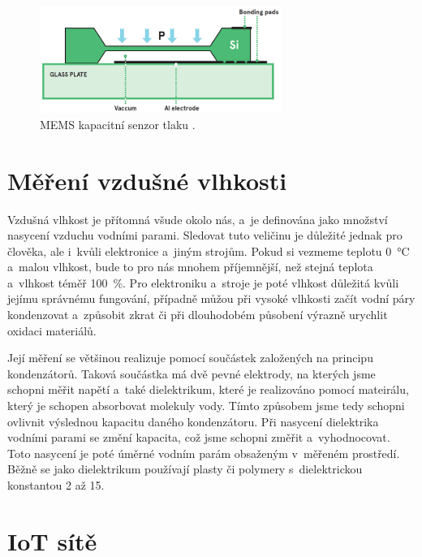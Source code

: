 \begin{figure}
    \centering
    \includegraphics[width=0.7\textwidth]{obrazky/MEMS_capacitive_sensor.jpg}
    \caption[MEMS kapacitní senzor tlaku.]{MEMS kapacitní senzor tlaku \cite{AvnetMEMS}.}
    \label{fig_memsCapacitiveSensor}
\end{figure}

\section{Měření vzdušné vlhkosti}

Vzdušná vlhkost je přítomná všude okolo nás, a~je definována jako množství nasycení vzduchu vodními parami. Sledovat tuto veličinu je důležité jednak pro člověka, ale i~kvůli elektronice a~jiným strojům. Pokud si vezmeme teplotu \SI{0}{\celsius} a~malou vlhkost, bude to pro nás mnohem příjemnější, než stejná teplota a~vlhkost téměř \SI{100}{\percent}. Pro elektroniku a~stroje je poté vlhkost důležitá kvůli jejímu správnému fungování, případně můžou při vysoké vlhkosti začít vodní páry kondenzovat a~způsobit zkrat či při dlouhodobém působení výrazně urychlit oxidaci materiálů.

Její měření se většinou realizuje pomocí součástek založených na principu kondenzátorů. Taková součástka má dvě pevné elektrody, na kterých jsme schopni měřit napětí a~také dielektrikum, které je realizováno pomocí mateirálu, který je schopen absorbovat molekuly vody. Tímto způsobem jsme tedy schopni ovlivnit výslednou kapacitu daného kondenzátoru. Při nasycení dielektrika vodními parami se změní kapacita, což jsme schopni změřit a~vyhodnocovat. Toto nasycení je poté úměrné vodním parám obsaženým v~měřeném prostředí. Běžně se jako dielektrikum používají plasty či polymery s~dielektrickou konstantou 2 až 15.

\section{IoT sítě}

